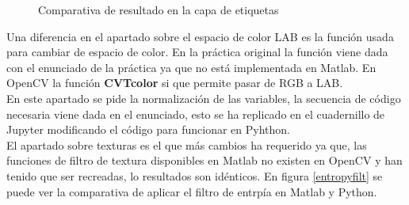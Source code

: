 \documentclass[a4paper,12pt]{report}
\begin{document}
\begin{figure}[!tbp]
  \centering
  \hfill
  \caption{Comparativa de resultado en la capa de etiquetas}
  \label{comprgb}
\end{figure}

Una diferencia en el apartado sobre el espacio de color LAB es la función usada para cambiar de espacio de color. En la práctica original la función viene dada con el enunciado de la práctica ya que no está implementada en Matlab. En OpenCV la función \textbf{CVTcolor} si que permite pasar de RGB a LAB.\\

En este apartado se pide la normalización de las variables, la secuencia de código necesaria viene dada en el enunciado, esto se ha replicado en el cuadernillo de Jupyter modificando el código para funcionar en Pyhthon.\\

El apartado sobre texturas es el que más cambios ha requerido ya que, las funciones de filtro de textura disponibles en Matlab no existen en OpenCV y han tenido que ser recreadas, lo resultados son idénticos. En figura \ref{entropyfilt} se puede ver la comparativa de aplicar el filtro de entrpía en Matlab y Python.
\end{document}
